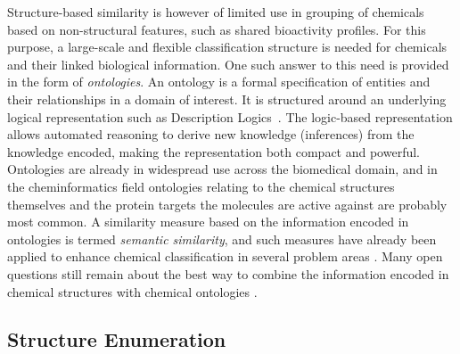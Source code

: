 \documentclass{sig-alternate}
\begin{document}
%
Structure-based similarity is however of limited use in grouping of
chemicals based on non-structural features, such as shared bioactivity
profiles. For this purpose, a large-scale and flexible classification
structure is needed for chemicals and their linked biological
information. One such answer to this need is provided in the form of
\emph{ontologies}.  An ontology is a formal specification of entities
and their relationships in a domain of interest. It is structured
around an underlying logical representation such as Description
Logics~\cite{baaderdl2007}. The logic-based representation allows
automated reasoning to derive new knowledge (inferences) from the
knowledge encoded, making the representation both compact and
powerful.  Ontologies are already in widespread use across the
biomedical domain, and in the cheminformatics field ontologies
relating to the chemical structures themselves and the protein targets
the molecules are active against are probably most common. A
similarity measure based on the information encoded in ontologies is
termed \emph{semantic similarity}, and such measures have already been
applied to enhance chemical classification in several problem areas
\cite{couto2010}. Many open questions still remain about the best way
to combine the information encoded in chemical structures with
chemical ontologies \cite{hastingsowled2010}.

\subsection{Structure Enumeration}
\label{sec:struct-enum}
\end{document}
